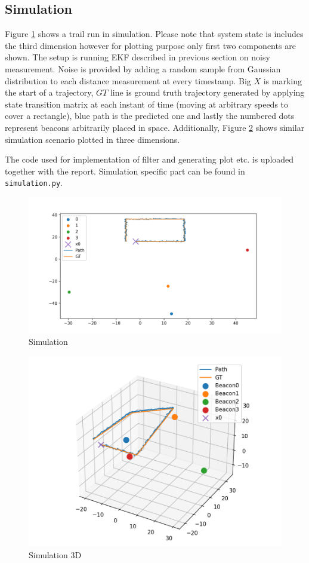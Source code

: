 \subsection{Simulation}

Figure \ref{fig:sim} shows a trail run in simulation. Please note that system state is includes the third dimension however for plotting purpose only first two components are shown. The setup is running EKF described in previous section on noisy measurement. Noise is provided by adding a random sample from Gaussian distribution to each distance measurement at every timestamp. Big $X$ is marking the start of a trajectory, $GT$ line is ground truth trajectory generated by applying state transition matrix at each instant of time (moving at arbitrary speeds to cover a rectangle), blue path is the predicted one and lastly the numbered dots represent beacons arbitrarily placed in space. Additionally, Figure \ref{fig:sim_3d} shows similar simulation scenario plotted in three dimensions.

The code used for implementation of filter and generating plot etc. is uploaded together with the report. Simulation specific part can be found in \verb+simulation.py+.

\begin{figure}[H]
    \centering
    \includegraphics[width=\linewidth]{figures/sim.png}
    \caption{Simulation}
    \label{fig:sim}
\end{figure}

\begin{figure}[H]
    \centering
    \includegraphics[width=\linewidth]{figures/sim_3d_path.png}
    \caption{Simulation 3D}
    \label{fig:sim_3d}
\end{figure}